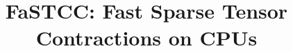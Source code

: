 \documentclass[]{article}
\begin{document}
\title{FaSTCC: Fast Sparse Tensor Contractions on CPUs}
%
\maketitle




%
%
%
%
%
%
%



\end{document}
